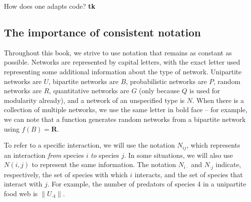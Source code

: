 How does one adapts code? \textbf{tk}

\subsection{The importance of consistent notation}

Throughout this book, we strive to use notation that remains as constant as
possible. Networks are represented by capital letters, with the exact letter
used representing some additional information about the type of network.
Unipartite networks are $U$, bipartite networks are $B$, probabilistic networks
are $P$, random networks are $R$, quantitative networks are $G$ (only because
$Q$ is used for modularity already), and a network of an unspecified type is
$N$. When there is a collection of multiple networks, we use the same letter in
bold face -- for example, we can note that a function generates random networks
from a bipartite network using $f(B) = \mathbf{R}$.

To refer to a specific interaction, we will use the notation $N_{ij}$, which
represents an interaction \emph{from} species $i$ \emph{to} species $j$. In some
situations, we will also use $N(i,j)$ to represent the same information. The
notation $N_{i\cdot}$ and $N_{\cdot j}$ indicate, respectively, the set of
species with which $i$ interacts, and the set of species that interact with $j$.
For example, the number of predators of species 4 in a unipartite food web is
$\|U_{\cdot 4}\|$.
